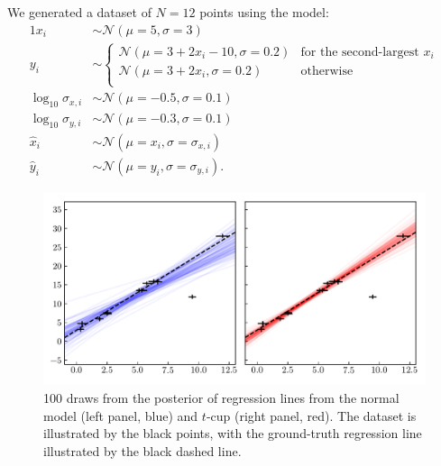 \documentclass[fleqn,usenatbib]{mnras}
\begin{document}
We generated a dataset of $N = 12$ points using the model:
\begin{alignat}{1}
    x_i& \sim \mathcal N (\mu = 5, \sigma = 3) \\
    y_i& \sim
    \begin{cases}
        \mathcal N (\mu = 3 + 2 x_i - 10, \sigma = 0.2) &
            \text{for the second-largest $x_i$} \\
        \mathcal N (\mu = 3 + 2 x_i, \sigma = 0.2) &
            \text{otherwise} \\
    \end{cases}\\
    \log_{10} \sigma_{x, i}& \sim \mathcal N (\mu = -0.5, \sigma = 0.1) \\
    \log_{10} \sigma_{y, i}& \sim \mathcal N (\mu = -0.3, \sigma = 0.1) \\
    \hat{x}_i& \sim \mathcal N (\mu = x_i, \sigma = \sigma_{x, i}) \\
    \hat{y}_i& \sim \mathcal N (\mu = y_i, \sigma = \sigma_{y, i}).
\end{alignat}

\begin{figure}
    \includegraphics[width=\linewidth]{graphics/regression_outlier.pdf}
    \caption{{\color{red} 100} draws from the posterior of regression lines from
    the normal model (left panel, blue) and $t$-cup (right panel, red). The
    dataset is illustrated by the black points, with the ground-truth regression
    line illustrated by the black dashed line.}
    \label{fig:results.outlier.regression}
\end{figure}
\end{document}
